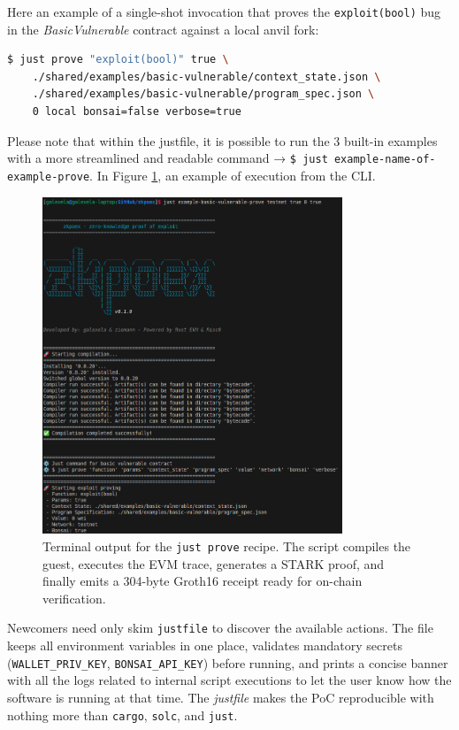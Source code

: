 Here an example of a single-shot invocation that proves the \texttt{exploit(bool)} bug in the \textit{BasicVulnerable} contract against a local \textsf{anvil} fork:
\begin{lstlisting}[caption={[One-line local proof]},label={example_just},language=bash]
$ just prove "exploit(bool)" true \
    ./shared/examples/basic-vulnerable/context_state.json \
    ./shared/examples/basic-vulnerable/program_spec.json \
    0 local bonsai=false verbose=true
\end{lstlisting}

Please note that within the justfile, it is possible to run the 3 built-in examples with a more streamlined and readable command → \texttt{\$ just example-{name-of-example}-prove}. In Figure \ref{fig:prove_local}, an example of execution from the CLI.

\begin{figure}[h]
  \centering
  \includegraphics[width=0.8\textwidth]{Images/Chap3/cli_local_proving.png}
  \caption{Terminal output for the \texttt{just prove} recipe.  The script compiles the guest, executes the EVM trace, generates a STARK proof, and finally emits a 304-byte Groth16 receipt ready for on-chain verification.}
  \label{fig:prove_local}
\end{figure}

Newcomers need only skim \texttt{justfile} to discover the available actions. The file keeps all environment variables in one place, validates mandatory secrets (\texttt{WALLET\_PRIV\_KEY}, \texttt{BONSAI\_API\_KEY}) before running, and prints a concise banner with all the logs related to internal script executions to let the user know how the software is running at that time. The \textit{justfile} makes the PoC reproducible with nothing more than \texttt{cargo}, \texttt{solc}, and \texttt{just}. 

